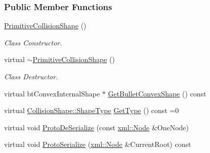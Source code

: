 \subsubsection*{Public Member Functions}
\begin{DoxyCompactItemize}
\item 
\hypertarget{classMezzanine_1_1PrimitiveCollisionShape_a8b2158d50aa727df63b0855cc7b92506}{
\hyperlink{classMezzanine_1_1PrimitiveCollisionShape_a8b2158d50aa727df63b0855cc7b92506}{PrimitiveCollisionShape} ()}
\label{classMezzanine_1_1PrimitiveCollisionShape_a8b2158d50aa727df63b0855cc7b92506}

\begin{DoxyCompactList}\small\item\em Class Constructor. \item\end{DoxyCompactList}\item 
\hypertarget{classMezzanine_1_1PrimitiveCollisionShape_af2bbe57380bf282703f997286a5efde3}{
virtual \hyperlink{classMezzanine_1_1PrimitiveCollisionShape_af2bbe57380bf282703f997286a5efde3}{$\sim$PrimitiveCollisionShape} ()}
\label{classMezzanine_1_1PrimitiveCollisionShape_af2bbe57380bf282703f997286a5efde3}

\begin{DoxyCompactList}\small\item\em Class Destructor. \item\end{DoxyCompactList}\item 
virtual btConvexInternalShape $\ast$ \hyperlink{classMezzanine_1_1PrimitiveCollisionShape_ac7eecc4d144b72fdfbea8a013fca441c}{GetBulletConvexShape} () const 
\item 
virtual \hyperlink{classMezzanine_1_1CollisionShape_ad04186055565998879b64176d6dd100d}{CollisionShape::ShapeType} \hyperlink{classMezzanine_1_1PrimitiveCollisionShape_ad3d4143a5640204b987e0b57eb24af41}{GetType} () const =0
\item 
virtual void \hyperlink{classMezzanine_1_1PrimitiveCollisionShape_a2257312048ee9085fa5d14f6b34caae1}{ProtoDeSerialize} (const \hyperlink{classMezzanine_1_1xml_1_1Node}{xml::Node} \&OneNode)
\item 
virtual void \hyperlink{classMezzanine_1_1PrimitiveCollisionShape_acfaab953833e9be503fddb2ee0f56d4f}{ProtoSerialize} (\hyperlink{classMezzanine_1_1xml_1_1Node}{xml::Node} \&CurrentRoot) const 
\end{DoxyCompactItemize}
